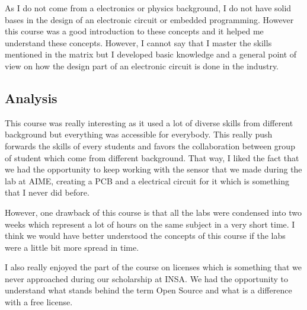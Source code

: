 As I do not come from a electronics or physics background, I do not have solid bases in the design of an electronic circuit or embedded programming. However this course was a good introduction to these concepts and it helped me understand these concepts. However, I cannot say that I master the skills mentioned in the matrix but I developed basic knowledge and a general point of view on how the design part of an electronic circuit is done in the industry.

\subsection{Analysis}

This course was really interesting as it used a lot of diverse skills from different background but everything was accessible for everybody. This really push forwards the skills of every students and favors the collaboration between group of student which come from different background. That way, I liked the fact that we had the opportunity to keep working with the sensor that we made during the lab at AIME, creating a PCB and a electrical circuit for it which is something that I never did before. 
\\\par
However, one drawback of this course is that all the labs were condensed into two weeks which represent a lot of hours on the same subject in a very short time. I think we would have better understood the concepts of this course if the labs were a little bit more spread in time. 
\\\par
I also really enjoyed the part of the course on licenses which is something that we never approached during our scholarship at INSA. We had the opportunity to understand what stands behind the term Open Source and what is a difference with a free license. 